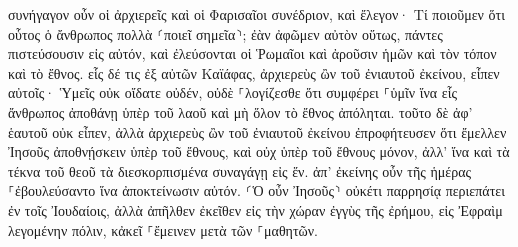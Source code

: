 \documentclass{openreader}
\begin{document}
συνήγαγον οὖν οἱ ἀρχιερεῖς καὶ οἱ Φαρισαῖοι συνέδριον, καὶ ἔλεγον· Τί ποιοῦμεν ὅτι οὗτος ὁ ἄνθρωπος πολλὰ ⸂ποιεῖ σημεῖα⸃; 
ἐὰν ἀφῶμεν αὐτὸν οὕτως, πάντες πιστεύσουσιν εἰς αὐτόν, καὶ ἐλεύσονται οἱ Ῥωμαῖοι καὶ ἀροῦσιν ἡμῶν καὶ τὸν τόπον καὶ τὸ ἔθνος. 
εἷς δέ τις ἐξ αὐτῶν Καϊάφας, ἀρχιερεὺς ὢν τοῦ ἐνιαυτοῦ ἐκείνου, εἶπεν αὐτοῖς· Ὑμεῖς οὐκ οἴδατε οὐδέν, 
οὐδὲ ⸀λογίζεσθε ὅτι συμφέρει ⸀ὑμῖν ἵνα εἷς ἄνθρωπος ἀποθάνῃ ὑπὲρ τοῦ λαοῦ καὶ μὴ ὅλον τὸ ἔθνος ἀπόληται. 
τοῦτο δὲ ἀφ’ ἑαυτοῦ οὐκ εἶπεν, ἀλλὰ ἀρχιερεὺς ὢν τοῦ ἐνιαυτοῦ ἐκείνου ἐπροφήτευσεν ὅτι ἔμελλεν Ἰησοῦς ἀποθνῄσκειν ὑπὲρ τοῦ ἔθνους, 
καὶ οὐχ ὑπὲρ τοῦ ἔθνους μόνον, ἀλλ’ ἵνα καὶ τὰ τέκνα τοῦ θεοῦ τὰ διεσκορπισμένα συναγάγῃ εἰς ἕν. 
ἀπ’ ἐκείνης οὖν τῆς ἡμέρας ⸀ἐβουλεύσαντο ἵνα ἀποκτείνωσιν αὐτόν. 
⸂Ὁ οὖν Ἰησοῦς⸃ οὐκέτι παρρησίᾳ περιεπάτει ἐν τοῖς Ἰουδαίοις, ἀλλὰ ἀπῆλθεν ἐκεῖθεν εἰς τὴν χώραν ἐγγὺς τῆς ἐρήμου, εἰς Ἐφραὶμ λεγομένην πόλιν, κἀκεῖ ⸀ἔμεινεν μετὰ τῶν ⸀μαθητῶν. 
\end{document}
